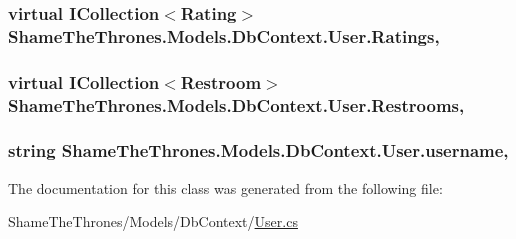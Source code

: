 \subsubsection[{\texorpdfstring{Ratings}{Ratings}}]{\setlength{\rightskip}{0pt plus 5cm}virtual I\+Collection$<${\bf Rating}$>$ Shame\+The\+Thrones.\+Models.\+Db\+Context.\+User.\+Ratings\hspace{0.3cm}{\ttfamily [get]}, {\ttfamily [set]}}\hypertarget{class_shame_the_thrones_1_1_models_1_1_db_context_1_1_user_a3bda22f9a2c17432f0976650f0786ae8}{}\label{class_shame_the_thrones_1_1_models_1_1_db_context_1_1_user_a3bda22f9a2c17432f0976650f0786ae8}
\subsubsection[{\texorpdfstring{Restrooms}{Restrooms}}]{\setlength{\rightskip}{0pt plus 5cm}virtual I\+Collection$<${\bf Restroom}$>$ Shame\+The\+Thrones.\+Models.\+Db\+Context.\+User.\+Restrooms\hspace{0.3cm}{\ttfamily [get]}, {\ttfamily [set]}}\hypertarget{class_shame_the_thrones_1_1_models_1_1_db_context_1_1_user_a341c9f8ef0ec6b9809cd6abc8927727e}{}\label{class_shame_the_thrones_1_1_models_1_1_db_context_1_1_user_a341c9f8ef0ec6b9809cd6abc8927727e}
\subsubsection[{\texorpdfstring{username}{username}}]{\setlength{\rightskip}{0pt plus 5cm}string Shame\+The\+Thrones.\+Models.\+Db\+Context.\+User.\+username\hspace{0.3cm}{\ttfamily [get]}, {\ttfamily [set]}}\hypertarget{class_shame_the_thrones_1_1_models_1_1_db_context_1_1_user_a81cb51c92555efac83c8fe8707fd28ea}{}\label{class_shame_the_thrones_1_1_models_1_1_db_context_1_1_user_a81cb51c92555efac83c8fe8707fd28ea}


The documentation for this class was generated from the following file\+:\begin{DoxyCompactItemize}
\item 
Shame\+The\+Thrones/\+Models/\+Db\+Context/\hyperlink{_user_8cs}{User.\+cs}\end{DoxyCompactItemize}
